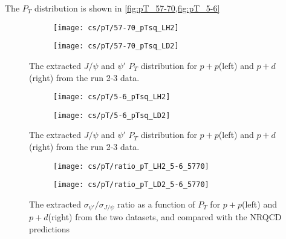 \documentclass[../main.tex]{subfiles}
\begin{document}

The $P_T$ distribution is shown in \cref{fig:pT_57-70,fig:pT_5-6}
\begin{figure}[h!]
	\centering
	\begin{subfigure}{0.45\linewidth}
		\texttt{[image: cs/pT/57-70\_pTsq\_LH2]}
	\end{subfigure}
	\begin{subfigure}{0.45\linewidth}
		\texttt{[image: cs/pT/57-70\_pTsq\_LD2]}
	\end{subfigure}
	\caption{The extracted $J/\psi$ and $\psi'$ $P_T$ distribution for $p+p$(left)
	and $p+d$(right) from the run 2-3 data.}
	\label{fig:pT_57-70}
\end{figure}
\begin{figure}[h!]
	\centering
	\begin{subfigure}{0.45\linewidth}
		\texttt{[image: cs/pT/5-6\_pTsq\_LH2]}
	\end{subfigure}
	\begin{subfigure}{0.45\linewidth}
		\texttt{[image: cs/pT/5-6\_pTsq\_LD2]}
	\end{subfigure}
	\caption{The extracted $J/\psi$ and $\psi'$ $P_T$ distribution for $p+p$(left)
	and $p+d$(right) from the run 2-3 data.}
	\label{fig:pT_5-6}
\end{figure}
\begin{figure}[h!]
	\centering
	\begin{subfigure}{0.45\linewidth}
		\texttt{[image: cs/pT/ratio\_pT\_LH2\_5-6\_5770]}
	\end{subfigure}
	\begin{subfigure}{0.45\linewidth}
		\texttt{[image: cs/pT/ratio\_pT\_LD2\_5-6\_5770]}
	\end{subfigure}
	\caption{The extracted  $\sigma_{\psi'}/\sigma_{J/\psi}$ ratio as a function of $P_T$ for $p+p$(left)
	and $p+d$(right) from the two datasets,	and compared with the NRQCD predictions}
\end{figure}
\end{document}
